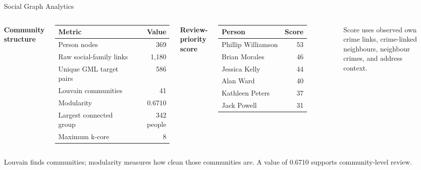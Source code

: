 ﻿\documentclass[aspectratio=169]{beamer}
\begin{document}
\begin{frame}{Social Graph Analytics}
  \small
  \begin{columns}[T]
      \textbf{Community structure}\\[3pt]
      \begin{tabular}{lr}
        \toprule
        \textbf{Metric} & \textbf{Value} \\
        \midrule
        Person nodes & 369 \\
        Raw social-family links & 1,180 \\
        Unique GML target pairs & 586 \\
        Louvain communities & 41 \\
        Modularity & 0.6710 \\
        Largest connected group & 342 people \\
        Maximum k-core & 8 \\
        \bottomrule
      \end{tabular}

      \textbf{Review-priority score}\\[3pt]
      \begin{tabular}{lr}
        \toprule
        \textbf{Person} & \textbf{Score} \\
        \midrule
        Phillip Williamson & 53 \\
        Brian Morales & 46 \\
        Jessica Kelly & 44 \\
        Alan Ward & 40 \\
        Kathleen Peters & 37 \\
        Jack Powell & 31 \\
        \bottomrule
      \end{tabular}

      \vspace{0.12cm}
      Score uses observed own crime links, crime-linked neighbours, neighbour crimes, and address context.
  \end{columns}

  \vspace{0.14cm}
  Louvain finds communities; modularity measures how clean those communities are. A value of 0.6710 supports community-level review.
\end{frame}
\end{document}

